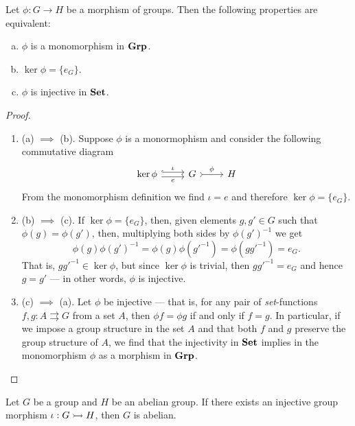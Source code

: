 \begin{proposition}
\label{prop:monic-in-grp}
Let \(\phi: G \to H\) be a morphism of groups. Then the following properties are
equivalent:
\begin{enumerate}[(a)]\setlength\itemsep{0em}
\item \(\phi\) is a monomorphism in \({\textbf{Grp}}\).

\item \(\ker \phi = \{e_G\}\).

\item \(\phi\) is injective in \({\textbf{Set}}\).
\end{enumerate}
\end{proposition}

\begin{proof}
\begin{enumerate}\setlength\itemsep{0em}
\item (a) \(\implies\) (b). Suppose \(\phi\) is a monormophism and consider the
following commutative diagram
\[
\begin{tikzcd}
\ker \phi \ar[r, shift left, hook, "\iota"] \ar[r, shift right, swap, "e"]
& G \ar[r, tail, "\phi"] & H
\end{tikzcd}
\]
From the monomorphism definition we find \(\iota = e\) and therefore \(\ker \phi
= \{e_G\}\).

\item (b) \(\implies\) (c). If \(\ker\phi = \{e_G\}\), then, given elements \(g,
g' \in G\) such that \(\phi(g) = \phi(g')\), then, multiplying both sides by
\(\phi{(g')}^{-1}\) we get
\[
  \phi(g) {\phi(g')}^{-1} = \phi(g) \phi(g'^{-1}) = \phi(gg'^{-1}) = e_G.
\]
That is, \(gg'^{-1} \in \ker\phi\), but since \(\ker\phi\) is trivial, then
\(gg'^{-1} = e_G\) and hence \(g = g'\) --- in other words, \(\phi\) is
injective.

\item (c) \(\implies\) (a). Let \(\phi\) be injective --- that is, for any pair
of \emph{set}-functions \(f, g: A \rightrightarrows G\) from a set \(A\), then
\(\phi f = \phi g\) if and only if \(f = g\). In particular, if we impose a
group structure in the set \(A\) and that both \(f\) and \(g\) preserve the
group structure of \(A\), we find that the injectivity in \({\textbf{Set}}\) implies in
the monomorphism \(\phi\) as a morphism in \({\textbf{Grp}}\).
\end{enumerate}
\end{proof}

\begin{proposition}
\label{prop:injective-morphism-abelian}
Let \(G\) be a group and \(H\) be an abelian group. If there exists an injective
group morphism \(\iota: G \rightarrowtail H\), then \(G\) is abelian.
\end{proposition}

